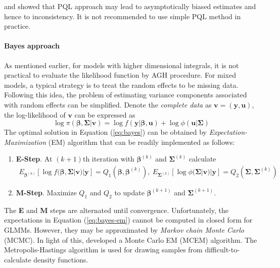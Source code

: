 \citet{breslow1995bias}  and \citet{pinheiro2006efficient} showed that PQL approach may lead to
asymptotically biased estimates and hence to inconsistency. It is not recommended to use simple PQL
method in practice. 


\paragraph{Bayes approach}
As mentioned earlier, for models with higher dimensional integrals, it is not practical to
evaluate the likelihood function by AGH procedure. For mixed models, a typical strategy is to treat
the random effects to be missing data. Following this idea, the problem of estimating variance
components associated with random effects can be simplified. Denote the \textit{complete data} as
$\bm v = (\bm y, \bm u)$, the log-likelihood of $\bm v$ can be expressed as 
\begin{equation}\label{eq:bayes}
	\log \pi(\bm \beta , \bm \Sigma|\bm v) = \log f(\bm y|\bm \beta, \bm u) + \log \phi(\bm u|\bm
	\Sigma)
\end{equation}  
The optimal solution in Equation (\ref{eq:bayes}) can be obtained by
\textit{Expectation-Maximization} (EM) algorithm that can be readily implemented as follows:
\begin{enumerate}
	\item \textbf{E-Step}. At $(k+1)$th iteration with $\bm \beta^{(k)}$ and $\bm\Sigma^{(k)}$  
	calculate 
	\begin{equation}\label{eq:bayes-em}
		\begin{aligned}
			E_{\bm \beta^{(k)}}[\log f(\bm \beta , \bm \Sigma|\bm v)|\bm y]= Q_1(\bm \beta, \bm \beta^{(k)}),
			~
			E_{\bm \Sigma^{(k)}}[\log \phi(\bm \Sigma|\bm v)|\bm y]= Q_2(\bm \Sigma, \bm \Sigma^{(k)})
		\end{aligned}
	\end{equation}
	\item \textbf{M-Step}. Maximize $Q_1$ and $Q_2$ to update  $\bm \beta^{(k+1)}$ and
	$\bm\Sigma^{(k+1)}$.
\end{enumerate}
The \textbf{E} and \textbf{M} steps are alternated until convergence. Unfortunately, the
expectations in Equation (\ref{eq:bayes-em}) cannot be computed in closed form for GLMMs. However,
they may be approximated by \textit{Markov chain Monte Carlo} (MCMC). In light of this,
\citet{mcculloch1997maximum} developed a Monte Carlo EM (MCEM) algorithm. The Metropolis-Hastings
algorithm is used for drawing samples from difficult-to-calculate density functions.


